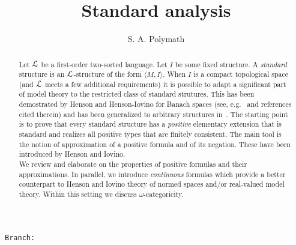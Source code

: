 \documentclass{amsproc}
\author{S. A. Polymath}
\newcommand\branch{}
\begin{document}
\title{Standard analysis}
\hfill\texttt{Branch:\ \branch\ \DTMnow}\bigskip
\maketitle
\raggedbottom

\begin{abstract}
  Let ${\EuScript L}$ be a first-order two-sorted language.
  Let $I$ be some fixed structure.
  A \textit{standard\/} structure is an ${\EuScript L}$-structure of the form $\langle M,I\rangle$.
  When $I$ is a compact topological space (and ${\EuScript L}$ meets a few additional requirements) it is possible to adapt a significant part of model theory to the restricted class of standard strutures.
  This has been demostrated by Henson and Henson-Iovino for Banach spaces (see, e.g.~\cite{HI} and references cited therein) and has been generalized to arbitrary structures in~\cite{clcl}.
  The starting point is to prove that every standard structure has a \textit{positive\/} elementary extension that is standard and realizes all positive types that are finitely consistent.
  The main tool is the notion of approximation of a positive formula and of its negation.
  These have been introduced by Henson and Iovino.\\[1ex]
  \noindent
  We review and elaborate on the properties of positive formulas and their approximations.
  In parallel, we introduce \textit{continuous\/} formulas which provide a better counterpart to Henson and Iovino theory of normed spaces and/or real-valued model theory.
  Within this setting we discuss $\omega$-categoricity.
\end{abstract}




\end{document}
